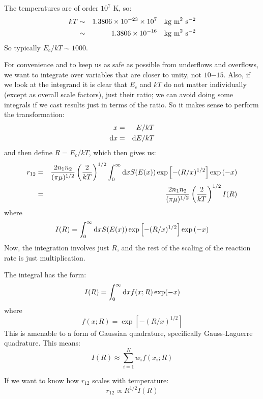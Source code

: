 The temperatures are of order $10^7$ K, so:
\begin{eqnarray}
  kT &\sim&
  1.3806 \times 10^{-23} \times 10^{7} \mathrm{\quad kg~m}^2\mathrm{~s}^{-2}\cr
&\sim& 
  1.3806 \times 10^{-16} \mathrm{\quad kg~m}^2\mathrm{~s}^{-2}
\end{eqnarray}
So typically $E_c/kT \sim 1000$.

For convenience and to keep us as safe as possible from underflows and
overflows, we want to integrate over variables that are closer to
unity, not $10{-15}$. Also, if we look at the integrand it is clear
that $E_c$ and $kT$ do not matter individually (except as overall
scale factors), just their ratio; we can avoid doing some integrals if
we cast results just in terms of the ratio.  So it makes sense to
perform the transformation:
\begin{eqnarray}
 x &=& E / kT \cr
 {\rm d}x &=& {\rm d}E / kT
\end{eqnarray}
and then define $R = E_c /kT$,
which then gives us:
\begin{eqnarray}
r_{12} &=& \frac{2 n_1 n_2}{(\pi \mu)^{1/2}}
\left(\frac{2}{kT}\right)^{1/2}
\int_0^\infty {\rm d}x S(E(x))
\exp\left[-(R/x)^{1/2}\right] \exp\left(- x \right) \cr
&=& \frac{2 n_1 n_2}{(\pi \mu)^{1/2}}
\left(\frac{2}{kT}\right)^{1/2} I(R)
\end{eqnarray}
where
\begin{equation}
I(R) = \int_0^\infty {\rm d}x S(E(x))
\exp\left[-(R/x)^{1/2}\right] \exp\left(- x \right) 
\end{equation}
Now, the integration involves just $R$, and the rest of the scaling of
the reaction rate is just multiplication.

The integral has the form:
\begin{equation}
I(R) = \int_0^{\infty} {\rm d}x f(x; R) \exp(-x)
\end{equation}
where
\begin{equation}
f(x; R) = 
\exp\left[-(R/x)^{1/2}\right]
\end{equation}
This is amenable to a form of Gaussian quadrature, specifically
Gauss-Laguerre quadrature. This means:
\begin{equation}
I(R) \approx \sum_{i=1}^N w_i f(x_i; R)
\end{equation}

If we want to know how $r_{12}$ scales with temperature:
\begin{equation}
r_{12} \propto R^{1/2} I(R)
\end{equation}

